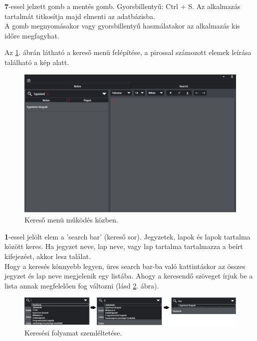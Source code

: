 \vspace{5pt} \noindent \textbf{7}-essel jelzett gomb a mentés gomb. Gyorsbillentyű: Ctrl + S. Az alkalmazás tartalmát titkosítja majd elmenti az adatbázisba.
\\A gomb megnyomásakor vagy gyorsbillentyű használatakor az alkalmazás kis időre megfagyhat.




\vspace{30pt}

Az \ref{fig:menu_search_2}. ábrán látható a kereső menü felépítése, a pirossal számozott elemek leírása található a kép alatt.

\begin{figure}[h]
	\centering
	\includegraphics[scale=0.5]{images/doc_4.png}
	\caption{Kereső menü működés közben.}
	\label{fig:menu_search_2}
\end{figure}

\vspace{5pt} \noindent \textbf{1}-essel jelölt elem a ’search bar’ (kereső sor). Jegyzetek, lapok és lapok tartalma között keres. Ha jegyzet neve, lap neve, vagy lap tartalma tartalmazza a beírt kifejezést, akkor lesz találat. 
\vspace{5pt} \\Hogy a keresés könnyebb legyen, üres search bar-ba való kattintáskor az összes jegyzet és lap neve megjelenik egy listába. Ahogy a keresendő szöveget írjuk be a lista annak megfelelően fog változni (lásd \ref{fig:menu_search_searchBar}. ábra). 

\begin{figure}[h]
	\centering
	\includegraphics[scale=0.4]{images/doc_5.png}
	\caption{Keresési folyamat szemléltetése.}
	\label{fig:menu_search_searchBar}
\end{figure}
	
